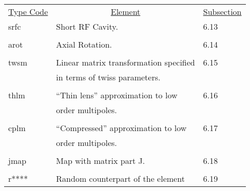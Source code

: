 \begin{center}
\begin{tabular}{lll}
\multicolumn{1}{c}{\underline{Type Code}} &
\multicolumn{1}{c}{\underline{Element}}   &
\multicolumn{1}{c}{\underline{Subsection}} \\
\hspace{1.5em}srfc    &         Short RF Cavity.                    &  \hspace{2em}6.13\\
\vspace{-3mm}& &\\
\hspace{1.5em}arot    &         Axial Rotation.                      &  \hspace{2em}6.14\\
\vspace{-3mm}& &\\
\hspace{1.5em}twsm    &      Linear matrix transformation specified &  \hspace{2em}6.15\\
               &         in terms of twiss parameters.        &      \\
\vspace{-3mm}& &\\
\hspace{1.5em}thlm    &         ``Thin lens'' approximation to low    &\hspace{2em}6.16\\
               &         order multipoles.                    &      \\
\vspace{-3mm}& &\\
\hspace{1.5em}cplm    &         ``Compressed'' approximation to low   &\hspace{2em}6.17\\
               &         order multipoles.                    &      \\
\vspace{-3mm}& &\\
\hspace{1.5em}jmap    &         Map with matrix part J.              &  \hspace{2em}6.18\\
\vspace{-3mm}& &\\
\hspace{1.5em}r****   &         Random counterpart of the element   &  \hspace{2em}6.19\\

\end{tabular}
\end{center}
